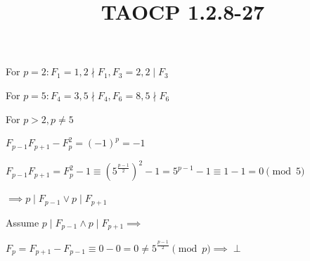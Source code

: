 \documentclass{article}
\title{TAOCP 1.2.8\mbox{-}27}
\begin{document}
\maketitle

For \( p = 2: F_{1} = 1, 2 \nmid F_{1}, F_{3} = 2, 2 \mid F_{3} \)

For \( p = 5: F_{4} = 3, 5 \nmid F_{4}, F_{6} = 8, 5 \nmid F_{6} \)

For \( p > 2, p \neq 5 \)

\( F_{p-1}F_{p+1} - F_{p}^{2} = {(-1)}^{p} = -1 \)

\( F_{p-1}F_{p+1} = F_{p}^{2} - 1 \equiv {(5^{\frac{p-1}{2}})}^{2} -1 = 5^{p-1} - 1 \equiv 1 -1 = 0\pmod{5} \)

\( \implies p \mid F_{p-1} \lor p \mid F_{p+1} \)

Assume \( p \mid F_{p-1} \land p \mid F_{p+1} \implies \)

\( F_{p} = F_{p+1} - F_{p-1} \equiv 0 - 0 = 0 \neq 5^{\frac{p-1}{2}} \pmod p \implies \perp \)
\end{document}

